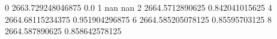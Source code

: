0 2663.729248046875 0.0
1 nan nan
2 2664.5712890625 0.842041015625
4 2664.68115234375 0.951904296875
6 2664.585205078125 0.85595703125
8 2664.587890625 0.858642578125
